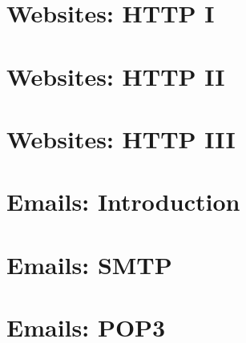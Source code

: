 \section{Websites: HTTP I}
\section{Websites: HTTP II}
\section{Websites: HTTP III}

\section{Emails: Introduction}


\section{Emails: SMTP}

\section{Emails: POP3}
